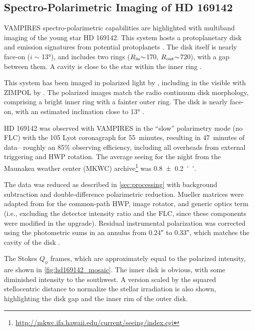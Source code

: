 \subsection{Spectro-Polarimetric Imaging of HD 169142\label{sec:hd169142}}

VAMPIRES spectro-polarimetric capabilities are highlighted with multiband imaging of the young star HD 169142. This system hosts a protoplanetary disk \citep{quanz_gaps_2013} and emission signatures from potential protoplanets \citep{hammond_confirmation_2023}. The disk itself is nearly face-on ($i{\sim}$\ang{13}), and includes two rings ($R_{\rm in}{\sim}$\SI{170}{\mas}, $R_{\rm out}{\sim}$\SI{720}{\mas}), with a gap between them. A cavity is close to the star within the inner ring \citep{fedele_alma_2017}.

This system has been imaged in polarized light by \citet{kuhn_imaging_2001,quanz_gaps_2013,monnier_polarized_2017,pohl_circumstellar_2017}, including in the visible with ZIMPOL by \citet{bertrang_hd_2018}. The polarized images match the radio continuum disk morphology, comprising a bright inner ring with a fainter outer ring. The disk is nearly face-on, with an estimated inclination close to \ang{13} \citep{fedele_alma_2017}.

HD 169142 was observed with VAMPIRES in the ``slow'' polarimetry mode (no FLC) with the \SI{105}{\mas} Lyot coronagraph for \SI{55}{minutes}, resulting in \SI{47}{minutes} of data-- roughly an 85\% observing efficiency, including all overheads from external triggering and HWP rotation. The average seeing for the night from the Maunakea weather center (MKWC) archive\footnote{\url{http://mkwc.ifa.hawaii.edu/current/seeing/index.cgi}} was \SI{0.8\pm0.2}{''}.

The data was reduced as described in \autoref{sec:processing} with background subtraction and double-difference polarimetric reduction. Mueller matrices were adapted from \citet{zhang_characterizing_2023} for the common-path HWP, image rotator, and generic optics term (i.e., excluding the detector intensity ratio and the FLC, since these components were modified in the upgrade). Residual instrumental polarization was corrected using the photometric sums in an annulus from \ang{;;0.24} to \ang{;;0.33}, which matches the cavity of the disk \citep{bertrang_hd_2018}.

The Stokes $Q_\phi$ frames, which are approximately equal to the polarized intensity, are shown in \autoref{fig:hd169142_mosaic}. The inner disk is obvious, with some diminished intensity to the southwest. A version scaled by the squared stellocentric distance to normalize the stellar irradiation is also shown, highlighting the disk gap and the inner rim of the outer disk.

